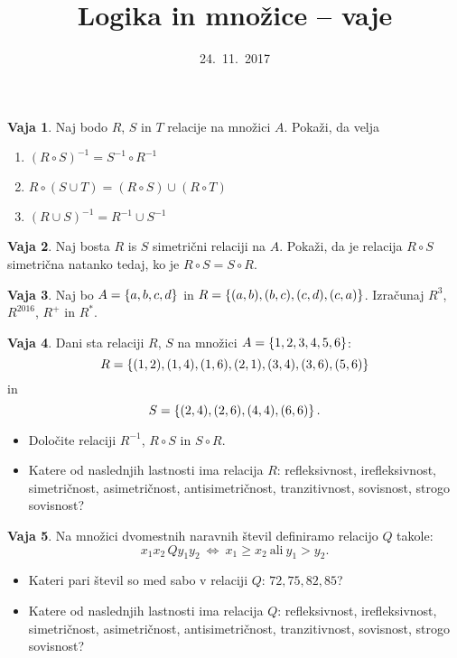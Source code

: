 \documentclass{article}
\theoremstyle{definition}
\newtheorem{vaja}{Vaja}
\begin{document}
\title{Logika in množice -- vaje}
\date{24.~11.~2017}
\maketitle

\begin{vaja}
Naj bodo $R$, $S$ in $T$ relacije na množici $A$. Pokaži, da velja
\begin{enumerate}
\item $(R \circ S)^{-1} = S^{-1} \circ R^{-1}$
\item $R \circ (S \cup T) = (R \circ S) \cup (R \circ T)$
\item $(R \cup S)^{-1} = R^{-1} \cup S^{-1}$
\end{enumerate}
\end{vaja}

\begin{vaja}
Naj bosta $R$ is $S$ simetrični relaciji na $A$. Pokaži, da je relacija $R \circ S$ simetrična natanko tedaj, ko je $R \circ S = S \circ R$.
\end{vaja}

\begin{vaja}
Naj bo $A = \set{a,b,c,d}$ in $R = \set{(a,b),(b,c),(c,d),(c,a)}$. Izračunaj $R^3$, $R^{2016}$, $R^+$ in $R^*$.
\end{vaja}

\begin{vaja}
Dani sta relaciji $R$, $S$ na množici $A = \set{1,2,3,4,5,6}$:
\[R = \set{(1,2),(1,4),(1,6),(2,1),(3,4),(3,6),(5,6)}\]
in
\[S = \set{(2,4),(2,6),(4,4),(6,6)}.\]
\begin{itemize}
\item Določite relaciji $R^{-1}$, $R \circ S$ in $S \circ R$.
\item Katere od naslednjih lastnosti ima relacija $R$:
refleksivnost, irefleksivnost, simetričnost, asi\-metrič\-nost, anti\-si\-met\-rič\-nost,
tranzitivnost, sovisnost, strogo sovisnost?
\end{itemize}
\end{vaja}

\begin{vaja}
Na množici dvomestnih naravnih števil definiramo relacijo $Q$ takole:
\[x_1x_2 \, Q y_1y_2 \ \Leftrightarrow \ x_1 \ge x_2 \ \mbox{ali} \ y_1 > y_2.\]
\begin{itemize}
\item Kateri pari števil so med sabo v relaciji $Q$:
           $72,75,82,85$?
\item Katere od naslednjih lastnosti ima relacija $Q$:
refleksivnost, irefleksivnost, simetričnost, asi\-metrič\-nost, anti\-si\-met\-rič\-nost,
tranzitivnost, sovisnost, strogo sovisnost?
\end{itemize}
\end{vaja}
\end{document}

